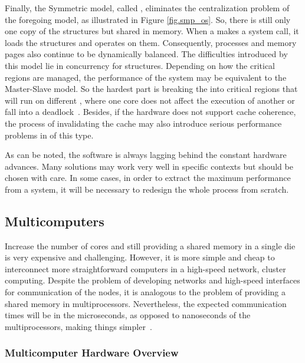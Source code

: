 			Finally, the Symmetric model, called \smp, eliminates the centralization
			problem of the foregoing model, as illustrated in Figure \ref{fig.smp_os}.
			So, there is still only one copy of the \os structures but shared in memory.
			When a \cpu makes a system call, it loads the structures and operates on them.
			Consequently, processes and memory pages also continue to be dynamically balanced.
			The difficulties introduced by this model lie in concurrency for \os structures.
			Depending on how the critical regions are managed, the performance of the system
			may be equivalent to the Master-Slave model. So the hardest part is breaking the
			\os into critical regions that will run on different \cpus, where one core does
			not affect the execution of another or fall into a deadlock~\cite{tanenbaum:4ed}.
			Besides, if the hardware does not support cache coherence, the process of
			invalidating the cache may also introduce serious performance problems in \oses of this type.

			As can be noted, the software is always lagging behind the constant hardware advances.
			Many solutions may work very well in specific contexts but should be chosen with care.
			In some cases, in order to extract the maximum performance from a system, it will be
			necessary to redesign the whole process from scratch.

	\subsection{Multicomputers}
	\label{sec.multicomputers}

		Increase the number of cores and still providing a shared memory in a
		single die is very expensive and challenging.
		However, it is more simple and cheap to interconnect more straightforward
		computers in a high-speed network, \eg cluster computing.
		Despite the problem of developing networks and high-speed interfaces
		for communication of the nodes, it is analogous to the problem of
		providing a shared memory in multiprocessors.
		Nevertheless, the expected communication times will be in the
		microseconds, as opposed to nanoseconds of the multiprocessors,
		making things simpler~\cite{tanenbaum:4ed}.

			\subsubsection{Multicomputer Hardware Overview}
			\label{sec.multicomputers_hw}

